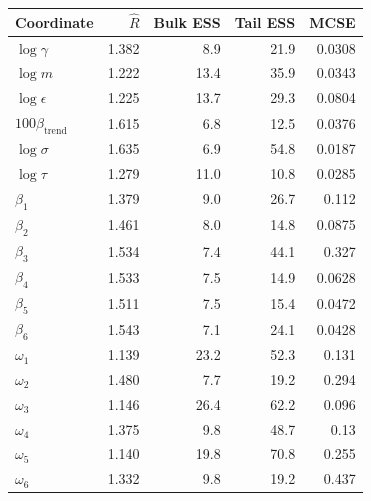 \begin{tabular}{lrrrr}
\toprule
Coordinate & $\widehat R$ & Bulk ESS & Tail ESS & MCSE \\
\midrule
$\log\gamma$ & 1.382 & 8.9 & 21.9 & 0.0308 \\
$\log m$ & 1.222 & 13.4 & 35.9 & 0.0343 \\
$\log\epsilon$ & 1.225 & 13.7 & 29.3 & 0.0804 \\
$100\beta_{\mathrm{trend}}$ & 1.615 & 6.8 & 12.5 & 0.0376 \\
$\log\sigma$ & 1.635 & 6.9 & 54.8 & 0.0187 \\
$\log\tau$ & 1.279 & 11.0 & 10.8 & 0.0285 \\
$\beta_1$ & 1.379 & 9.0 & 26.7 & 0.112 \\
$\beta_2$ & 1.461 & 8.0 & 14.8 & 0.0875 \\
$\beta_3$ & 1.534 & 7.4 & 44.1 & 0.327 \\
$\beta_4$ & 1.533 & 7.5 & 14.9 & 0.0628 \\
$\beta_5$ & 1.511 & 7.5 & 15.4 & 0.0472 \\
$\beta_6$ & 1.543 & 7.1 & 24.1 & 0.0428 \\
$\omega_1$ & 1.139 & 23.2 & 52.3 & 0.131 \\
$\omega_2$ & 1.480 & 7.7 & 19.2 & 0.294 \\
$\omega_3$ & 1.146 & 26.4 & 62.2 & 0.096 \\
$\omega_4$ & 1.375 & 9.8 & 48.7 & 0.13 \\
$\omega_5$ & 1.140 & 19.8 & 70.8 & 0.255 \\
$\omega_6$ & 1.332 & 9.8 & 19.2 & 0.437 \\
\bottomrule
\end{tabular}
